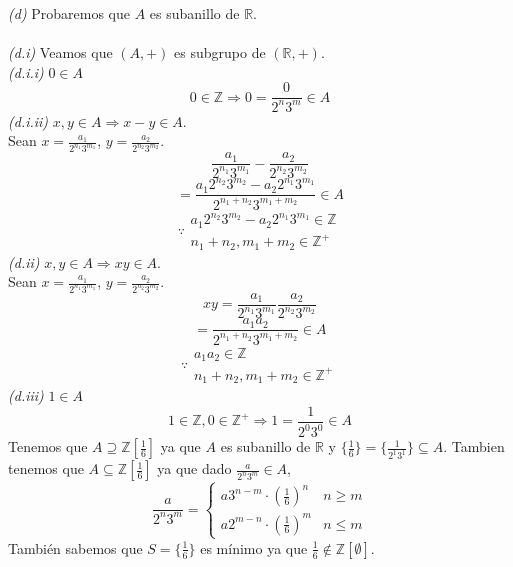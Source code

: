 \documentclass{article}
\newcommand{\R}{\mathbb{R}}
\begin{document}
\begin{multicols}{2}
\textit{(d)} Probaremos que $A$ es subanillo de $\R$.\\\\
\indent \textit{(d.i)} Veamos que $(A,+)$ es subgrupo de $(\R,+)$.\\
\indent \indent \textit{(d.i.i)} $0 \in A$
$$
0 \in \mathbb{Z} \Rightarrow 0 =\frac{0}{2^n3^m} \in A
$$
\indent \indent \textit{(d.i.ii)} $x,y\in A  \Rightarrow x-y \in A$.\\
\indent \indent \indent Sean $x=\frac{a_1}{2^{n_1}3^{m_1}}$, $y=\frac{a_2}{2^{n_2}3^{m_2}}$.
$$
\frac{a_1}{2^{n_1}3^{m_1}} - \frac{a_2}{2^{n_2}3^{m_2}}
$$
$$
= \frac{a_1 2^{n_2} 3^{m_2} - a_2 2^{n_1} 3^{m_1}}{2^{n_1+n_2}3^{m_1+m_2}} \in A
$$
$$
\because
\left.\begin{array}{l}
    a_1 2^{n_2} 3^{m_2} - a_2 2^{n_1} 3^{m_1} \in \mathbb{Z}\\
    n_1+n_2, m_1+m_2 \in \mathbb{Z}^+
\end{array}\right.
$$
\indent \textit{(d.ii)} $x,y\in A \Rightarrow xy\in A$.\\
\indent \indent \indent Sean $x=\frac{a_1}{2^{n_1}3^{m_1}}$, $y=\frac{a_2}{2^{n_2}3^{m_2}}$.
$$
xy= \frac{a_1}{2^{n_1}3^{m_1}} \frac{a_2}{2^{n_2}3^{m_2}}
$$
$$
= \frac{a_1 a_2}{2^{n_1+n_2}3^{m_1+m_2}} \in A
$$
$$
\because
\left.\begin{array}{l}
    a_1 a_2 \in \mathbb{Z}\\
    n_1+n_2, m_1+m_2 \in \mathbb{Z}^+
\end{array}\right.
$$
\indent\textit{(d.iii)} $1\in A$
$$
1 \in \mathbb{Z} , 0 \in \mathbb{Z}^+ \Rightarrow 1= \frac{1}{2^0 3^0} \in A
$$
\indent Tenemos que $A \supseteq \mathbb{Z}[\frac{1}{6}]$ ya que $A$ es subanillo de \indent $\R$ y $\{\frac{1}{6}\}= \{\frac{1}{2^1 3^1}\} \subseteq A$. Tambien tenemos que \indent $A \subseteq \mathbb{Z}[\frac{1}{6}]$ ya que dado $\frac{a}{2^n3^m}\in A$,
$$
\frac{a}{2^n 3^m} = 
\left\{\begin{array}{ll}
    a3^{n-m} \cdot \left( \frac{1}{6} \right) ^n & n\ge m\\
    a2^{m-n} \cdot \left( \frac{1}{6} \right) ^m & n\le m
\end{array}\right.
$$
\indent También sabemos que $S = \{\frac{1}{6}\}$ es mínimo ya que \indent $\frac{1}{6}\notin \mathbb{Z}[\emptyset]$.\\\\\\



\end{multicols}
\end{document}
